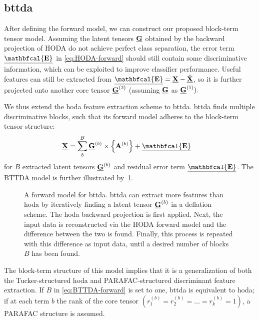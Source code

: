 \subsection{\Acl{bttda}}
After defining the forward model, we can construct our proposed block-term
tensor model.
Assuming the latent tensors $\underline{\mathbf{G}}$
obtained by the backward projection of HODA do not achieve perfect
class separation, the error term $\ten{\mathbfcal{E}}$ in
\cref{eq:HODA-forward} should still contain some discriminative
information, which can be exploited to improve classifier
performance.
Useful features can still be extracted from $\ten{\mathbfcal{E}} = \ten{X} -
\hat{\ten{X}}$, so it is further projected onto another core tensor
$\underline{\mathbf{G}}^{(2)}$ (assuming $\underline{\mathbf{G}}$ as $\underline{\mathbf{G}}^{(1)}).$

We thus extend the \ac{hoda} feature extraction scheme to \acf{bttda}.
\Ac{bttda} finds multiple discriminative blocks, such that its forward
model adheres to the block-term tensor structure:
\begin{align}
	\ten{X} & = \sum_b^B\ten{G}^{(b)}\mmpr{\mat{A}^{(b)}} + \ten{\mathbfcal{E}}
	\label{eq:BTTDA-forward}
\end{align}
for $B$ extracted latent tensors $\underline{\mathbf{G}}^{(b)}$ and residual error term
$\ten{\mathbfcal{E}}$.
The BTTDA model is further illustrated by~\cref{fig:BTTDA}.
\begin{figure}[t]
	
  \caption[A forward model for \acs{bttda}.]{A forward model for \acf{bttda}.
    \Ac{bttda} can extract more features
    than \ac{hoda} by iteratively finding a latent tensor $\underline{\mathbf{G}}^{(b)}$ in a
		deflation scheme.
    The \ac{hoda} backward projection is first applied. Next, the
		input data is reconstructed via the HODA forward model and the
		difference between the two is found.
		Finally, this process is repeated with this difference as input data, until a
		desired number of blocks $B$ has been found.}
	\label{fig:BTTDA}
\end{figure}
The block-term structure of this model implies that it is a generalization of both
the Tucker-structured \ac{hoda} and PARAFAC-structured discriminant feature
extraction.
If $B$ in \cref{eq:BTTDA-forward} is set to one, \ac{bttda} is equivalent to
\ac{hoda}; if at each term $b$ the rank of the core tensor
$(r_1^{(b)}=r_2^{(b)}=\ldots=r_k^{(b)}=1)$, a PARAFAC structure is assumed.

